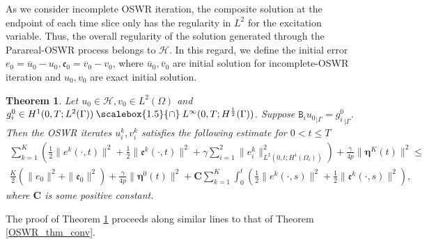 \documentclass[11pt]{article}
\newcommand*{\medcap}{\mathbin{\scalebox{1.5}{\ensuremath{\cap}}}}
\newtheorem{theorem}{Theorem}[section]
\newtheorem{remark}[theorem]{Remark}
\begin{document}
As we consider incomplete OSWR iteration, the composite solution at the endpoint of each time slice only has the regularity in $L^2$ for the excitation variable. Thus, the overall regularity of the solution generated through the Parareal-OSWR process belongs to $\mathcal{H}$. In this regard, we define the initial error $e_0=\overline{u}_0-u_0, \mathfrak{e}_0= \overline{v}_0-v_0$, where $\overline{u}_0, \overline{v}_0$ are initial solution for incomplete-OSWR iteration and $u_0, v_0$ are exact initial solution.


\begin{theorem}\label{incomplete_OSWR_thm_conv}
Let $u_0\in \mathcal{H}, v_0\in L^2(\Omega)$ and $g_i^{0}\in H^1(0, T;L^2(\Gamma))\medcap L^{\infty}(0, T;H^{\frac{1}{2}}(\Gamma))$. Suppose ${\mathtt{B}_iu_0}_{|\Gamma}={g_i^{0}}_{|\Gamma}$. Then the OSWR iterates $u_i^{k}, v_i^{k}$ satisfies the following estimate for $0<t\leq T$
\begin{multline}\label{OSWR_est_inc}
 \sum_{k=1}^K  \left( \frac{1}{2}\parallel {e}^{k}(\cdot,t)\parallel^2 + \frac{1}{2}\parallel \mathfrak{e}^{k}(\cdot, t)\parallel^2 +\gamma\sum_{i=1}^2 \parallel {e}_i^{k}\parallel_{L^2(0,t;H^1(\Omega_i))}^2\right) +\frac{\gamma}{4p} \parallel\boldsymbol{\eta}^{K}(t)\parallel^2 \leq \\ \frac{K}{2} \left( \parallel e_0\parallel^2 + \parallel \mathfrak{e}_0\parallel^2 \right) +\frac{\gamma}{4p} \parallel\boldsymbol{\eta}^{0}(t)\parallel^2 + \boldsymbol{C}\sum_{k=1}^K \int_0^t \left( \frac{1}{2}\parallel {e}^{k}(\cdot,s)\parallel^2 + \frac{1}{2}\parallel \mathfrak{e}^{k}(\cdot, s)\parallel^2 \right), 
\end{multline}
where $\boldsymbol{C}$ is some positive constant.
\end{theorem}
The proof of Theorem \ref{incomplete_OSWR_thm_conv} proceeds along similar lines to that of Theorem \ref{OSWR_thm_conv}.
\end{document}
